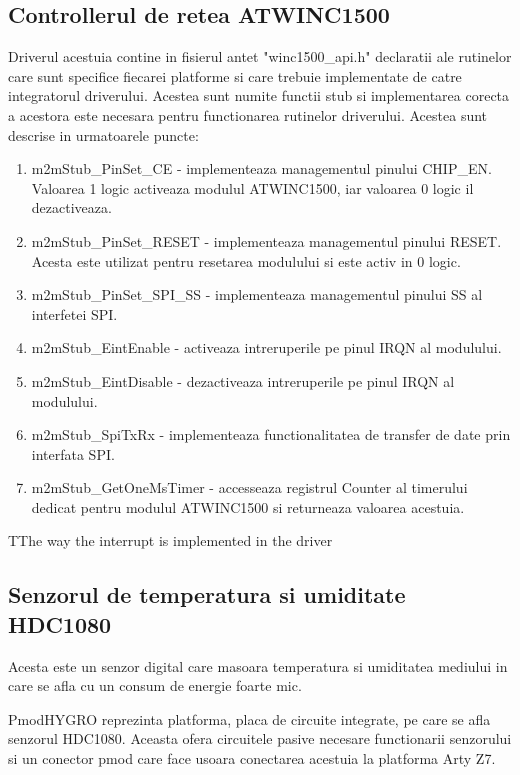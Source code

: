 \subsection{Controllerul de retea ATWINC1500}\label{subsec:atwinc1500}
Driverul acestuia contine in fisierul antet "winc1500\_api.h" declaratii ale rutinelor care sunt specifice fiecarei platforme si care trebuie implementate de catre 
integratorul driverului. Acestea sunt numite functii stub si implementarea corecta a acestora este necesara pentru functionarea rutinelor driverului. Acestea sunt 
descrise in urmatoarele puncte:
\begin{enumerate}
	\item m2mStub\_PinSet\_CE - implementeaza managementul pinului CHIP\_EN. Valoarea 1 logic activeaza modulul ATWINC1500, iar valoarea 0 logic il dezactiveaza.
	\item m2mStub\_PinSet\_RESET - implementeaza managementul pinului RESET. Acesta este utilizat pentru resetarea modulului si este activ in 0 logic.
	\item m2mStub\_PinSet\_SPI\_SS - implementeaza managementul pinului SS al interfetei SPI. 
	\item m2mStub\_EintEnable - activeaza intreruperile pe pinul IRQN al modulului.
	\item m2mStub\_EintDisable - dezactiveaza intreruperile pe pinul IRQN al modulului.
	\item m2mStub\_SpiTxRx - implementeaza functionalitatea de transfer de date prin interfata SPI.
	\item m2mStub\_GetOneMsTimer - accesseaza registrul Counter al timerului dedicat pentru modulul ATWINC1500 si returneaza valoarea acestuia.
\end{enumerate}

TThe way the interrupt is implemented in the driver

\subsection{Senzorul de temperatura si umiditate HDC1080}\label{subsec:hdc1080}
Acesta este un senzor digital care masoara temperatura si umiditatea mediului in care se afla cu un consum de energie foarte mic. 

PmodHYGRO reprezinta platforma, placa de circuite integrate, pe care se afla senzorul HDC1080. Aceasta ofera circuitele pasive necesare functionarii senzorului si 
un conector pmod care face usoara conectarea acestuia la platforma Arty Z7.

